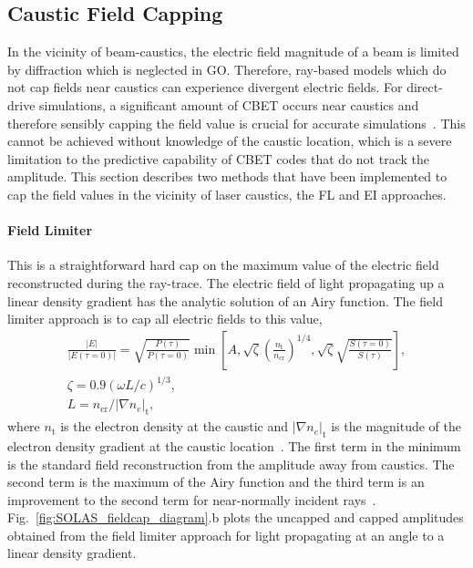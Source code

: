 \subsection{Caustic Field Capping}%
\label{sec:SOLAS_caustic_cap}
In the vicinity of beam-caustics, the electric field magnitude of a beam is limited by diffraction which is neglected in \ac{GO}.
Therefore, ray-based models which do not cap fields near caustics can experience divergent electric fields.
For direct-drive simulations, a significant amount of \ac{CBET} occurs near caustics and therefore sensibly capping the field value is crucial for accurate simulations~\cite{colaitis_adaptive_2019}.
This cannot be achieved without knowledge of the caustic location, which is a severe limitation to the predictive capability of \ac{CBET} codes that do not track the amplitude.
This section describes two methods that have been implemented to cap the field values in the vicinity of laser caustics, the \ac{FL} and \ac{EI} approaches.

\paragraph*{Field Limiter}
This is a straightforward hard cap on the maximum value of the electric field reconstructed during the ray-trace.
The electric field of light propagating up a linear density gradient has the analytic solution of an Airy function.
The field limiter approach is to cap all electric fields to this value,
\begin{equation}
    \begin{gathered}
        \frac{|E|}{|E(\tau=0)|} = \sqrt{\frac{P(\tau)}{P(\tau=0)}} \min\left[ A, \sqrt{\zeta}\left( \frac{n_{\text{t}}}{n_{\text{cr}}} \right)^{1/4}, \sqrt{\zeta}\sqrt{\frac{S(\tau=0)}{S(\tau)}} \right], \\
        \zeta = 0.9\left( \omega L/c \right)^{1/3}, \\
        L = n_{\text{cr}}/|\nabla n_e|_\text{t},
    \end{gathered}
\end{equation}
where $n_{\text{t}}$ is the electron density at the caustic and $|\nabla n_e|_\text{t}$ is the magnitude of the electron density gradient at the caustic location~\cite{igumenshchev_crossed-beam_2012,follett_ray-based_2018,kruer_physics_2003}.
The first term in the minimum is the standard field reconstruction from the amplitude away from caustics.
The second term is the maximum of the Airy function and the third term is an improvement to the second term for near-normally incident rays~\cite{follett_validation_2022}.
Fig.~\ref{fig:SOLAS_fieldcap_diagram}.b plots the uncapped and capped amplitudes obtained from the field limiter approach for light propagating at an angle to a linear density gradient.

